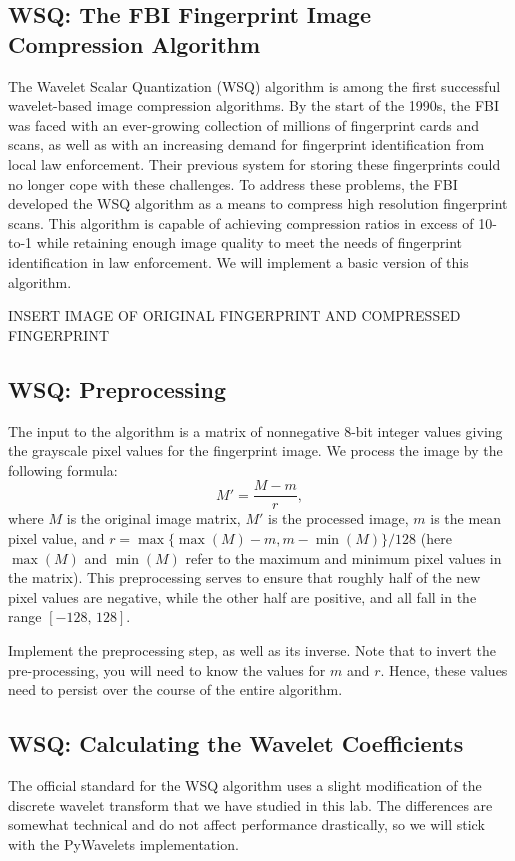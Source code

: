 \subsection*{WSQ: The FBI Fingerprint Image Compression Algorithm}
The Wavelet Scalar Quantization (WSQ) algorithm is among the first successful wavelet-based
image compression algorithms. By the start of the 1990s, the FBI was faced with an
ever-growing collection of millions of fingerprint cards and scans, as well as with
an increasing demand for fingerprint identification from local law enforcement. Their
previous system for storing these fingerprints could no longer cope with these challenges.
To address these problems, the FBI developed the WSQ algorithm as a means to compress
high resolution fingerprint scans. This algorithm is capable of achieving compression ratios
in excess of 10-to-1 while retaining enough image quality to meet the needs of fingerprint
identification in law enforcement. We will implement a basic version of this algorithm.

INSERT IMAGE OF ORIGINAL FINGERPRINT AND COMPRESSED FINGERPRINT

\subsection*{WSQ: Preprocessing}
The input to the algorithm is a matrix of nonnegative 8-bit integer values giving
the grayscale pixel values for the fingerprint image. We process the image
by the following formula:
\[
M' = \frac{M-m}{r},
\]
where $M$ is the original image matrix, $M'$ is the processed image,
$m$ is the mean pixel value, and $r = \max\{\max(M) - m, m - \min(M)\}/128$
(here $\max(M)$ and $\min(M)$ refer to the maximum and minimum pixel values
in the matrix). This preprocessing serves to ensure that roughly half of the
new pixel values are negative, while the other half are positive, and all fall
in the range $[-128,\,128]$. 
\begin{problem}
Implement the preprocessing step, as well as its inverse. Note that to invert
the pre-processing, you will need to know the values for $m$ and $r$. Hence,
these values need to persist over the course of the entire algorithm.
\end{problem}

\subsection*{WSQ: Calculating the Wavelet Coefficients}
The official standard for the WSQ algorithm uses a slight modification of the
discrete wavelet transform that we have studied in this lab. The differences
are somewhat technical and do not affect performance drastically, so we will
stick with the PyWavelets implementation. 

